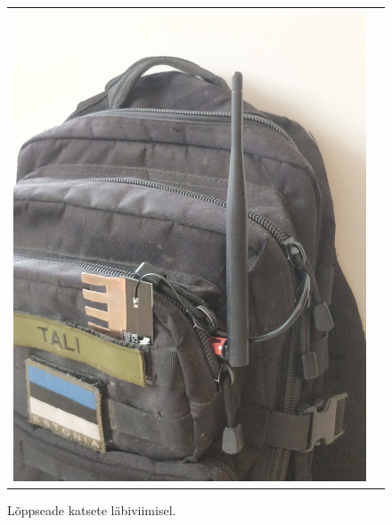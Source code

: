 \documentclass[12pt]{article}
\begin{document}
\begin{figure}[h]
\begin{center}
\begin{tabular}{c c}
\begin{minipage}{0.4\textwidth}
                \includegraphics[width=\textwidth]{figures/fipykotis2.jpg}
            \end{minipage}
        \end{tabular}
        \end{center}
        \caption{Lõppseade katsete läbiviimisel.}
        \label{fig:fipykaasas}
    \end{figure}
\end{document}

